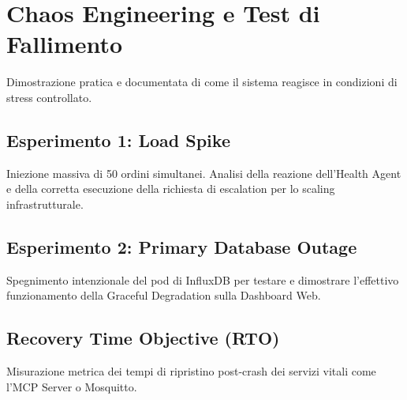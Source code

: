 
\chapter{Chaos Engineering e Test di Fallimento}
\label{cap:chaos_engineering}

Dimostrazione pratica e documentata di come il sistema reagisce in condizioni di stress controllato.

\section{Esperimento 1: Load Spike}
\label{sec:esperimento_1}
Iniezione massiva di 50 ordini simultanei. Analisi della reazione dell'Health Agent e della corretta esecuzione della richiesta di escalation per lo scaling infrastrutturale.

\section{Esperimento 2: Primary Database Outage}
\label{sec:esperimento_2}
Spegnimento intenzionale del pod di InfluxDB per testare e dimostrare l'effettivo funzionamento della Graceful Degradation sulla Dashboard Web.

\section{Recovery Time Objective (RTO)}
\label{sec:rto}
Misurazione metrica dei tempi di ripristino post-crash dei servizi vitali come l'MCP Server o Mosquitto.